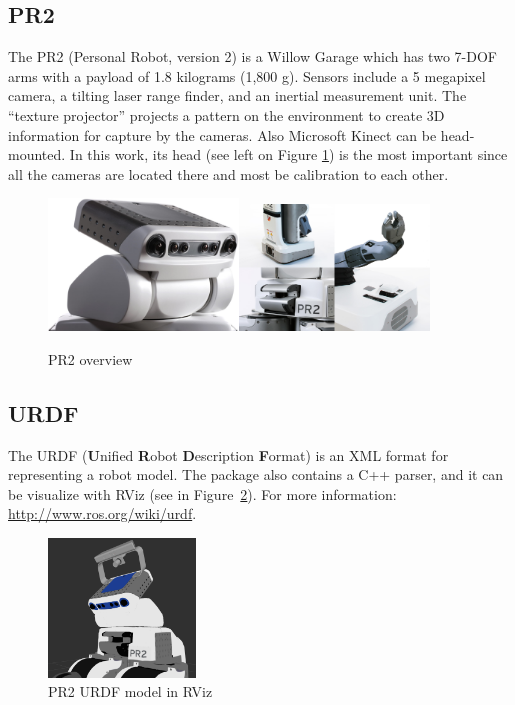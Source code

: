 \subsection{PR2}
\label{sec:PR2}

The PR2 (Personal Robot, version 2) is a Willow Garage which has two 7-DOF arms with a payload of 1.8 kilograms (1,800 g). Sensors include a 5 megapixel camera, a tilting laser range finder, and an inertial measurement unit. The ``texture projector'' projects a pattern on the environment to create 3D information for capture by the cameras. Also Microsoft Kinect can be head-mounted. In this work, its head (see left on Figure \ref{fig:pr2}) is the most important since all the cameras are located there and most be calibration to each other.
\begin{figure}[!htbp]
 \centering
 \includegraphics[width=0.45\textwidth]{images/PR2_01.jpg}\includegraphics[width=0.45\textwidth]{images/PR2_joint.jpg}
 \caption{PR2 overview}
 \label{fig:pr2}
\end{figure}

\subsection{URDF}
\label{sec:urdf}

The URDF (\textbf{U}nified \textbf{R}obot \textbf{D}escription \textbf{F}ormat) is an XML format for representing a robot model. The package also contains a C++ parser, and it can be visualize with RViz (see in Figure~\ref{fig:pr2_urdf}).
For more information: \url{http://www.ros.org/wiki/urdf}.
\begin{figure}[!htbp]
 \centering
 \includegraphics[width=0.35\textwidth]{images/screenshots/PR2_urdf.png}
 \caption{PR2 URDF model in RViz}
 \label{fig:pr2_urdf}
\end{figure}



